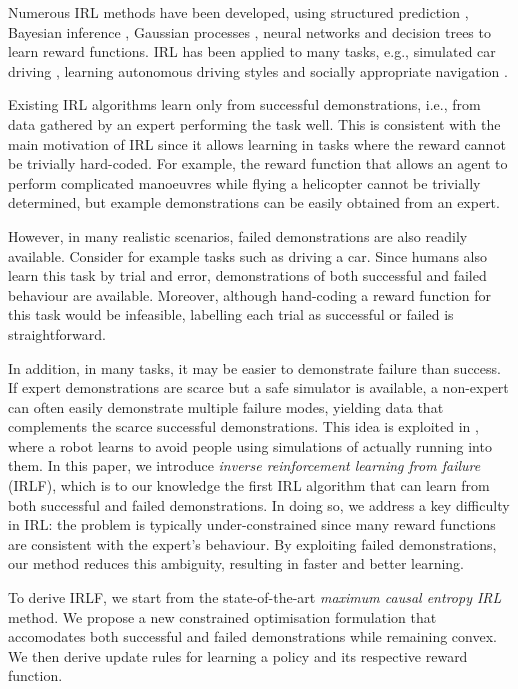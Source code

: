 \documentclass[letterpaper]{article}
\begin{document}
Numerous IRL methods have been developed, using structured prediction \cite{ratliff2006maximum}, Bayesian inference \cite{ramachandran2007bayesian}, Gaussian processes \cite{levine2011nonlinear}, neural networks and decision trees \cite{ratliff2007boosting} to learn reward functions. IRL has been applied to many tasks, e.g., simulated car driving \cite{abbeel2004apprenticeship}, learning autonomous driving styles \cite{kuderer2015learning} and socially appropriate navigation \cite{henry2010learning,vasquez2014inverse}. 

Existing IRL algorithms learn only from successful demonstrations, i.e., from data gathered by an expert performing the task well. This is consistent with the main motivation of IRL since it allows learning in tasks where the reward cannot be trivially hard-coded.  For example, the reward function that allows an agent to perform complicated manoeuvres while flying a helicopter cannot be trivially determined, but example demonstrations can be easily obtained from an expert.

However, in many realistic scenarios, failed demonstrations are also readily available.  Consider for example tasks such as driving a car.  Since humans also learn this task by trial and error, demonstrations of both successful and failed behaviour are available. Moreover, although hand-coding a reward function for this task would be infeasible, labelling each trial as successful or failed is straightforward.

In addition, in many tasks, it may be easier to demonstrate failure than success.  If expert demonstrations are scarce but a safe simulator is available, a non-expert can often easily demonstrate multiple failure modes, yielding data that complements the scarce successful demonstrations. This idea is exploited in \cite{choi2015}, where a robot learns to avoid people using simulations of actually running into them.
In this paper, we introduce \emph{inverse reinforcement learning from failure} (IRLF), which is to our knowledge the first IRL algorithm that can learn from both successful and failed demonstrations. In doing so, we address a key difficulty in IRL: the problem is typically under-constrained since many reward functions are consistent with the expert's behaviour.  By exploiting failed demonstrations, our method reduces this ambiguity, resulting in faster and better learning.

To derive IRLF, we start from the state-of-the-art \emph{maximum causal entropy IRL} \cite{ziebart2008maximum,ziebart2010modelingthesis} method. We propose a new constrained optimisation formulation that accomodates both successful and failed demonstrations while remaining convex.  We then derive update rules for learning a policy and its respective reward function.
\end{document}
